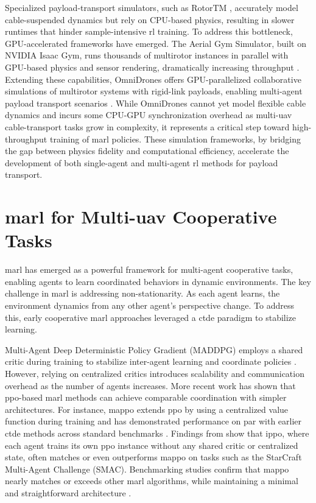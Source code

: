 Specialized payload-transport simulators, such as RotorTM \cite{Li2022RotorTMAF}, accurately model cable-suspended dynamics but rely on CPU-based physics, resulting in slower runtimes that hinder sample-intensive \gls{rl} training. To address this bottleneck, GPU-accelerated frameworks have emerged. The Aerial Gym Simulator, built on NVIDIA Isaac Gym, runs thousands of multirotor instances in parallel with GPU-based physics and sensor rendering, dramatically increasing throughput \cite{aerial_gym_simulator}. Extending these capabilities, OmniDrones offers GPU-parallelized collaborative simulations of multirotor systems with rigid-link payloads, enabling multi-agent payload transport scenarios \cite{xu_omnidrones_2024}. While OmniDrones cannot yet model flexible cable dynamics and incurs some CPU-GPU synchronization overhead as multi-\gls{uav} cable-transport tasks grow in complexity, it represents a critical step toward high-throughput training of \gls{marl} policies. These simulation frameworks, by bridging the gap between physics fidelity and computational efficiency, accelerate the development of both single-agent and multi-agent \gls{rl} methods for payload transport.


\section{\gls{marl} for Multi-\gls{uav} Cooperative Tasks}

\gls{marl} has emerged as a powerful framework for multi-agent cooperative tasks, enabling agents to learn coordinated behaviors in dynamic environments. The key challenge in \gls{marl} is addressing non-stationarity. As each agent learns, the environment dynamics from any other agent's perspective change. To address this, early cooperative \gls{marl} approaches leveraged a \gls{ctde}  paradigm to stabilize learning.

Multi-Agent Deep Deterministic Policy Gradient (MADDPG) employs a shared critic during training to stabilize inter-agent learning and coordinate policies \cite{Lowe2017MultiAgentAF}. However, relying on centralized critics introduces scalability and communication overhead as the number of agents increases. More recent work has shown that \gls{ppo}-based \gls{marl} methods can achieve comparable coordination with simpler architectures. For instance, \gls{mappo} extends \gls{ppo} by using a centralized value function during training and has demonstrated performance on par with earlier \gls{ctde} methods across standard benchmarks \cite{yu_surprising_2022}. Findings from \cite{witt_is_2020} show that \gls{ippo}, where each agent trains its own \gls{ppo} instance without any shared critic or centralized state, often matches or even outperforms \gls{mappo} on tasks such as the StarCraft Multi-Agent Challenge (SMAC). Benchmarking studies confirm that \gls{mappo} nearly matches or exceeds other \gls{marl} algorithms, while maintaining a minimal and straightforward architecture \cite{Papoudakis2020BenchmarkingMD}.

